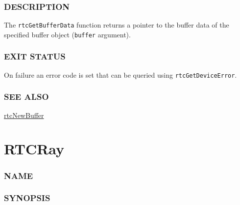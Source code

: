 \subsubsection{DESCRIPTION}\label{description}

The \texttt{rtcGetBufferData} function returns a pointer to the buffer
data of the specified buffer object (\texttt{buffer} argument).

\subsubsection{EXIT STATUS}\label{exit-status}

On failure an error code is set that can be queried using
\texttt{rtcGetDeviceError}.

\subsubsection{SEE ALSO}\label{see-also}

\hyperref[rtcnewbuffer]{rtcNewBuffer}

\pagebreak

\section{RTCRay}\label{rtcray}

\subsubsection{NAME}\label{name}

\begin{Shaded}
\begin{Highlighting}[]
\OperatorTok{{-}}
\end{Highlighting}
\end{Shaded}

\subsubsection{SYNOPSIS}\label{synopsis}

